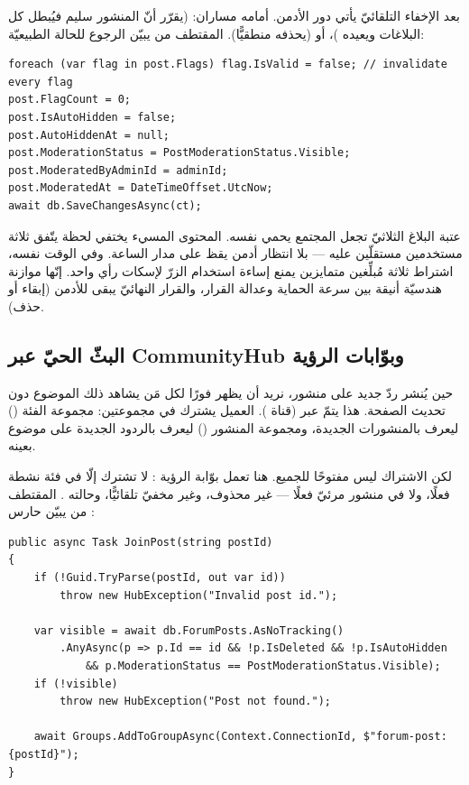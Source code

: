 بعد الإخفاء التلقائيّ يأتي دور الأدمن. أمامه مساران:  (يقرّر أنّ
المنشور سليم فيُبطل كل البلاغات ويعيده )، أو  (يحذفه
منطقيًّا). المقتطف من  يبيّن الرجوع للحالة الطبيعيّة:

\begin{english}
\begin{lstlisting}[language={[Sharp]C}]
foreach (var flag in post.Flags) flag.IsValid = false; // invalidate every flag
post.FlagCount = 0;
post.IsAutoHidden = false;
post.AutoHiddenAt = null;
post.ModerationStatus = PostModerationStatus.Visible;
post.ModeratedByAdminId = adminId;
post.ModeratedAt = DateTimeOffset.UtcNow;
await db.SaveChangesAsync(ct);
\end{lstlisting}
\end{english}

\begin{spotlight}
عتبة البلاغ الثلاثيّ تجعل المجتمع يحمي نفسه. المحتوى المسيء يختفي لحظة يتّفق ثلاثة
مستخدمين مستقلّين عليه — بلا انتظار أدمن يقظ على مدار الساعة. وفي الوقت نفسه، اشتراط
ثلاثة مُبلِّغين متمايزين يمنع إساءة استخدام الزرّ لإسكات رأي واحد. إنّها موازنة
هندسيّة أنيقة بين سرعة الحماية وعدالة القرار، والقرار النهائيّ يبقى للأدمن (إبقاء أو حذف).
\end{spotlight}

\subsection{البثّ الحيّ عبر CommunityHub وبوّابات الرؤية}

حين يُنشر ردّ جديد على منشور، نريد أن يظهر فورًا لكل مَن يشاهد ذلك الموضوع دون تحديث
الصفحة. هذا يتمّ عبر  (قناة ). العميل يشترك في مجموعتين:
مجموعة الفئة () ليعرف بالمنشورات الجديدة، ومجموعة المنشور
() ليعرف بالردود الجديدة على موضوع بعينه.

لكن الاشتراك ليس مفتوحًا للجميع. هنا تعمل بوّابة الرؤية : لا تشترك إلّا في فئة
نشطة فعلًا، ولا في منشور مرئيّ فعلًا — غير محذوف، وغير مخفيّ تلقائيًّا، وحالته
. المقتطف من  يبيّن حارس :

\begin{english}
\begin{lstlisting}[language={[Sharp]C}]
public async Task JoinPost(string postId)
{
    if (!Guid.TryParse(postId, out var id))
        throw new HubException("Invalid post id.");

    var visible = await db.ForumPosts.AsNoTracking()
        .AnyAsync(p => p.Id == id && !p.IsDeleted && !p.IsAutoHidden
            && p.ModerationStatus == PostModerationStatus.Visible);
    if (!visible)
        throw new HubException("Post not found.");

    await Groups.AddToGroupAsync(Context.ConnectionId, $"forum-post:{postId}");
}
\end{lstlisting}
\end{english}


